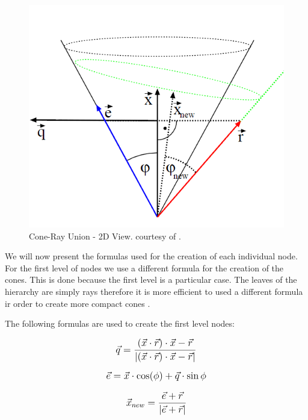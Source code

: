 \begin{figure}[!htb]
    \centering
    \includegraphics[scale=0.40]{Images/Cone_Union}
    \caption{\label{fig:cru}Cone-Ray Union - 2D View. \small{courtesy of \cite{Szecsi06}}.}
\end{figure}

We will now present the formulas used for the creation of each individual node. For the first level of nodes we use a different formula for the creation of the cones. This is done because the first level is a particular case. The leaves of the hierarchy are simply rays therefore it is more efficient to used a different formula ir order to create more compact cones \cite{Szecsi06}.

\medskip

The following formulas are used to create the first level nodes:

\begin{equation}
    \mathlarger{\vec{q} = \frac{ (\vec{x} \cdot \vec{r}) \cdot \vec{x} - \vec{r} }
                                {|(\vec{x} \cdot \vec{r}) \cdot \vec{x} - \vec{r}|}}
\end{equation}

\begin{equation}
    \mathlarger{\vec{e} = \vec{x} \cdot \cos(\phi) + \vec{q} \cdot \sin{\phi}}
\end{equation}

\begin{equation}
     \mathlarger{\vec{x}_{new} = \frac{ \vec{e} + \vec{r} }
                                      {|\vec{e} + \vec{r}|}}
\end{equation}

